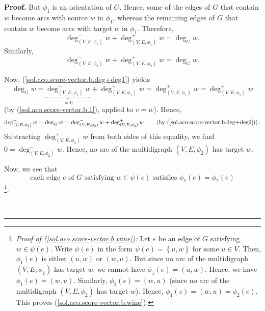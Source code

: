 \documentclass[numbers=enddot,12pt,final,onecolumn,notitlepage]{scrartcl}%
\theoremstyle{definition}
\newenvironment{proof}[1][Proof]{\noindent\textbf{#1.} }{\ \rule{0.5em}{0.5em}}
\begin{document}
\begin{proof}
But $\phi_{1}$ is an orientation of $G$. Hence, some of the edges of $G$ that
contain $w$ become arcs with source $w$ in $\phi_{1}$, whereas the remaining
edges of $G$ that contain $w$ become arcs with target $w$ in $\phi_{1}$.
Therefore,
\begin{equation}
\deg_{\left(  V,E,\phi_{1}\right)  }^{-}w+\deg_{\left(  V,E,\phi_{1}\right)
}^{+}w=\deg_{G}w. \label{sol.aco.score-vector.b.deg+deg1}%
\end{equation}
Similarly,%
\begin{equation}
\deg_{\left(  V,E,\phi_{2}\right)  }^{-}w+\deg_{\left(  V,E,\phi_{2}\right)
}^{+}w=\deg_{G}w. \label{sol.aco.score-vector.b.deg+deg2}%
\end{equation}


Now, (\ref{sol.aco.score-vector.b.deg+deg1}) yields%
\[
\deg_{G}w=\underbrace{\deg_{\left(  V,E,\phi_{1}\right)  }^{-}w}_{=0}%
+\deg_{\left(  V,E,\phi_{1}\right)  }^{+}w=\deg_{\left(  V,E,\phi_{1}\right)
}^{+}w=\deg_{\left(  V,E,\phi_{2}\right)  }^{+}w
\]
(by (\ref{sol.aco.score-vector.b.1}), applied to $v=w$). Hence,%
\[
\deg_{\left(  V,E,\phi_{2}\right)  }^{+}w=\deg_{G}w=\deg_{\left(  V,E,\phi
_{2}\right)  }^{-}w+\deg_{\left(  V,E,\phi_{2}\right)  }^{+}%
w\qquad \left(  \text{by (\ref{sol.aco.score-vector.b.deg+deg2}%
)}\right)  .
\]
Subtracting $\deg_{\left(  V,E,\phi_{2}\right)  }^{+}w$ from both sides of
this equality, we find $0=\deg_{\left(  V,E,\phi_{2}\right)  }^{-}w$. Hence,
no arc of the multidigraph $\left(  V,E,\phi_{2}\right)  $ has target $w$.

Now, we see that
\begin{equation}
\text{each edge }e\text{ of }G\text{ satisfying }w\in\psi\left(  e\right)
\text{ satisfies }\phi_{1}\left(  e\right)  =\phi_{2}\left(  e\right)
\label{sol.aco.score-vector.b.wine}%
\end{equation}
\footnote{\textit{Proof of (\ref{sol.aco.score-vector.b.wine}):} Let $e$ be an
edge of $G$ satisfying $w\in\psi\left(  e\right)  $. Write $\psi\left(
e\right)  $ in the form $\psi\left(  e\right)  =\left\{  u,w\right\}  $ for
some $u\in V$. Then, $\phi_{1}\left(  e\right)  $ is either $\left(
u,w\right)  $ or $\left(  w,u\right)  $. But since no arc of the multidigraph
$\left(  V,E,\phi_{1}\right)  $ has target $w$, we cannot have $\phi
_{1}\left(  e\right)  =\left(  u,w\right)  $. Hence, we have $\phi_{1}\left(
e\right)  =\left(  w,u\right)  $. Similarly, $\phi_{2}\left(  e\right)
=\left(  w,u\right)  $ (since no arc of the multidigraph $\left(  V,E,\phi
_{2}\right)  $ has target $w$). Hence, $\phi_{1}\left(  e\right)  =\left(
w,u\right)  =\phi_{2}\left(  e\right)  $. This proves
(\ref{sol.aco.score-vector.b.wine}).}.


\end{proof}
\end{document}
